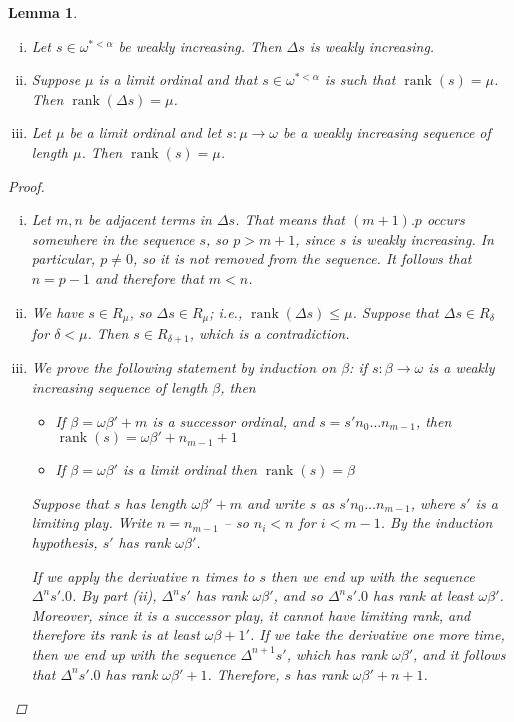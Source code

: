 \documentclass[11pt]{article} %
\theoremstyle{plain} %
\newtheorem{lemma}[theorem]{Lemma}
\theoremstyle{definition} %
\theoremstyle{note}
\theoremstyle{exercisestyle}
\newcommand*\from{\colon}
\DeclareMathOperator{\rank}{rank}
\begin{document}
\begin{lemma}
  \label{WeaklyIncreasingLemma}
  \begin{enumerate}[i)]
    \item Let $s\in\omega^{*<\alpha}$ be weakly increasing.  Then $\Delta s$ is weakly increasing.
    \item Suppose $\mu$ is a limit ordinal and that $s\in \omega^{*<\alpha}$ is such that $\rank(s)=\mu$.  Then $\rank(\Delta s)=\mu$.
    \item Let $\mu$ be a limit ordinal and let $s\from\mu\to\omega$ be a weakly increasing sequence of length $\mu$.  Then $\rank(s)=\mu$.  
  \end{enumerate}

  \begin{proof}
    \begin{enumerate}[(i): ]
      \item Let $m,n$ be adjacent terms in $\Delta s$.  That means that $(m+1).p$ occurs somewhere in the sequence $s$, so $p>m+1$, since $s$ is weakly increasing.  In particular, $p\ne 0$, so it is not removed from the sequence.  It follows that $n=p-1$ and therefore that $m<n$.  

      \item We have $s\in R_\mu$, so $\Delta s\in R_\mu$; i.e., $\rank(\Delta s)\le\mu$.  Suppose that $\Delta s\in R_\delta$ for $\delta<\mu$.  Then $s\in R_{\delta+1}$, which is a contradiction.

      \item We prove the following statement by induction on $\beta$: if $s\from\beta\to\omega$ is a weakly increasing sequence of length $\beta$, then
        \begin{itemize}
          \item If $\beta=\omega\beta'+m$ is a successor ordinal, and $s=s'n_0\dots n_{m-1}$, then $\rank(s) = \omega\beta'+n_{m-1}+1$
          \item If $\beta=\omega\beta'$ is a limit ordinal then $\rank(s)=\beta$
        \end{itemize}
        Suppose that $s$ has length $\omega\beta'+m$ and write $s$ as $s'n_0\dots n_{m-1}$, where $s'$ is a limiting play.  Write $n=n_{m-1}$ -- so $n_i<n$ for $i<m-1$.  By the induction hypothesis, $s'$ has rank $\omega\beta'$.  

        If we apply the derivative $n$ times to $s$ then we end up with the sequence $\Delta^n s'.0$.  By part (ii), $\Delta^n s'$ has rank $\omega\beta'$, and so $\Delta^n s'.0$ has rank at least $\omega\beta'$.  Moreover, since it is a successor play, it cannot have limiting rank, and therefore its rank is at least $\omega\beta+1'$.  If we take the derivative one more time, then we end up with the sequence $\Delta^{n+1}s'$, which has rank $\omega\beta'$, and it follows that $\Delta^n s'.0$ has rank $\omega\beta'+1$.  Therefore, $s$ has rank $\omega\beta'+n+1$.  


\end{enumerate}
\end{proof}
\end{lemma}
\end{document}
